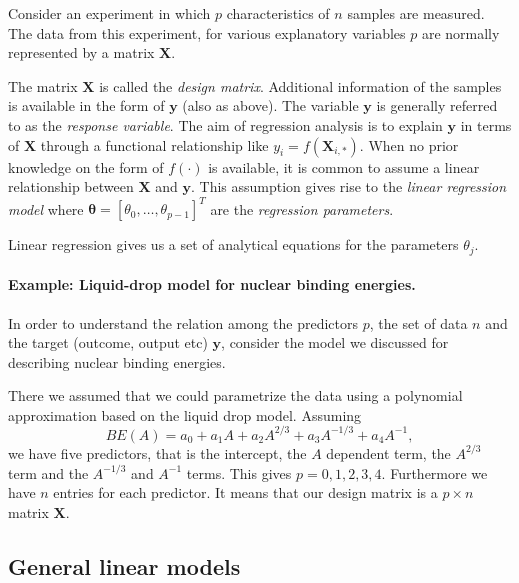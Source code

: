 \documentclass[%
oneside,                 %
final,                   %
10pt]{article}
\newenvironment{block_mdfboxadmon}[1][]{
\begin{block_mdfboxmdframed}[frametitle=#1]
}
{
\end{block_mdfboxmdframed}
}
\begin{document}
\begin{block_mdfboxadmon}[]


Consider an experiment in which $p$ characteristics of $n$ samples are
measured. The data from this experiment, for various explanatory variables $p$ are normally represented by a matrix  
$\mathbf{X}$.

The matrix $\mathbf{X}$ is called the \emph{design
matrix}. Additional information of the samples is available in the
form of $\bm{y}$ (also as above). The variable $\bm{y}$ is
generally referred to as the \emph{response variable}. The aim of
regression analysis is to explain $\bm{y}$ in terms of
$\bm{X}$ through a functional relationship like $y_i =
f(\mathbf{X}_{i,\ast})$. When no prior knowledge on the form of
$f(\cdot)$ is available, it is common to assume a linear relationship
between $\bm{X}$ and $\bm{y}$. This assumption gives rise to
the \emph{linear regression model} where $\bm{\theta} = [\theta_0, \ldots,
\theta_{p-1}]^{T}$ are the \emph{regression parameters}. 

Linear regression gives us a set of analytical equations for the parameters $\theta_j$.
\end{block_mdfboxadmon} %





\paragraph{Example: Liquid-drop model for nuclear binding energies.}

\begin{block_mdfboxadmon}[]
In order to understand the relation among the predictors $p$, the set of data $n$ and the target (outcome, output etc) $\bm{y}$,
consider the model we discussed for describing nuclear binding energies. 

There we assumed that we could parametrize the data using a polynomial approximation based on the liquid drop model.
Assuming 
\[
BE(A) = a_0+a_1A+a_2A^{2/3}+a_3A^{-1/3}+a_4A^{-1},
\]
we have five predictors, that is the intercept, the $A$ dependent term, the $A^{2/3}$ term and the $A^{-1/3}$ and $A^{-1}$ terms.
This gives $p=0,1,2,3,4$. Furthermore we have $n$ entries for each predictor. It means that our design matrix is a 
$p\times n$ matrix $\bm{X}$.
\end{block_mdfboxadmon} %




\subsection{General linear models}
\end{document}
